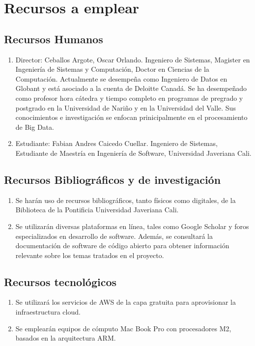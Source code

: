 \section{Recursos a emplear}
\label{sec:recursos}
\subsection{Recursos Humanos}
\begin{enumerate}
    \item Director: Ceballos Argote, Oscar Orlando. Ingeniero de Sistemas, Magister en Ingenier\'ia de Sistemas y Computaci\'on, Doctor en Ciencias de la Computaci\'on. Actualmente se desempe\~na como Ingeniero de Datos en Globant y est\'a asociado a la cuenta de Deloitte Canad\'a. Se ha desempe\~nado como profesor hora c\'atedra y tiempo completo en programas de pregrado y postgrado en la Universidad de Nari\~no y en la Universidad del Valle. Sus conocimientos e investigaci\'on se enfocan prinicipalmente en el procesamiento de Big Data.
    \item Estudiante: Fabian Andres Caicedo Cuellar. Ingeniero de Sistemas, Estudiante de Maestría en Ingeniería de Software, Universidad Javeriana Cali.
\end{enumerate}

\subsection{Recursos Bibliográficos y de investigación}
\begin{enumerate}
    \item Se harán uso de recursos bibliográficos, tanto físicos como digitales, de la Biblioteca de la Pontificia Universidad Javeriana Cali.

    \item Se utilizarán diversas plataformas en línea, tales como Google Scholar y foros especializados en desarrollo de software. Además, se consultará la documentación de software de código abierto para obtener información relevante sobre los temas tratados en el proyecto.
\end{enumerate}

\subsection{Recursos tecnológicos}
\begin{enumerate}
    \item Se utilizará los servicios de AWS de la capa gratuita para aprovisionar la infraestructura cloud.
    \item Se emplearán equipos de cómputo Mac Book Pro con procesadores M2, basados en la arquitectura ARM.
\end{enumerate}